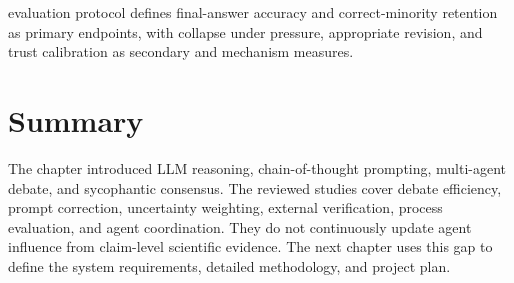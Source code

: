 evaluation protocol defines final-answer accuracy and correct-minority retention as primary endpoints, with collapse under pressure, appropriate revision, and trust calibration as secondary and mechanism measures.



\section{Summary}\label{sec:background-summary}

The chapter introduced LLM reasoning, chain-of-thought prompting, multi-agent
debate, and sycophantic consensus. The reviewed studies cover debate efficiency,
prompt correction, uncertainty weighting, external verification, process evaluation,
and agent coordination. They do not continuously update agent influence from
claim-level scientific evidence. The next chapter uses this gap to define the
system requirements, detailed methodology, and project plan.
